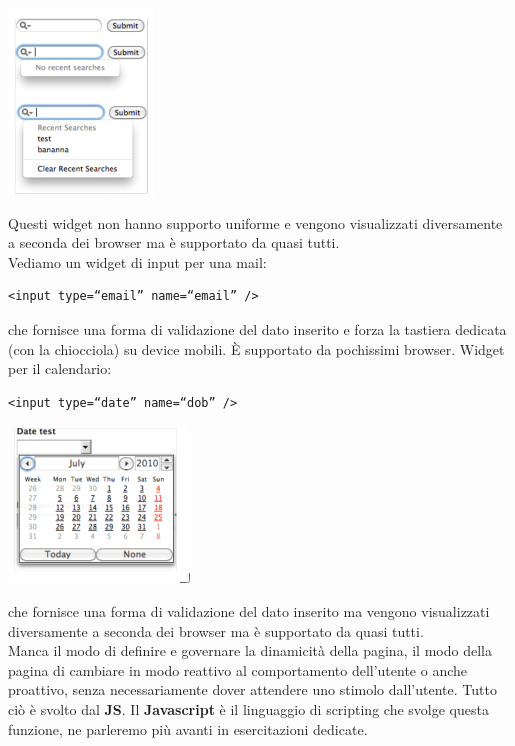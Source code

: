 \documentclass[a4paper,12pt, oneside]{book}
\begin{document}
\begin{center}
	\includegraphics[scale=0.8]{img/see.png}
\end{center}
Questi widget non hanno supporto uniforme e vengono visualizzati diversamente a seconda dei browser ma è supportato da quasi tutti.\\
Vediamo un widget di input per una mail:
\begin{verbatim}
<input type=“email” name=“email” />
\end{verbatim}
che fornisce una forma di validazione del dato inserito e forza la tastiera dedicata (con la chiocciola) su device mobili. È supportato da pochissimi browser.
\newpage
Widget per il calendario:
\begin{verbatim}
<input type=“date” name=“dob” />
\end{verbatim}
\begin{center}
	\includegraphics[scale=0.9]{img/date.png}
\end{center}
che fornisce una forma di validazione del dato inserito ma vengono visualizzati diversamente a seconda dei browser ma è supportato da quasi tutti.\\
Manca il modo di definire e governare la dinamicità della pagina, il modo
della pagina di cambiare in modo reattivo al comportamento dell'utente o anche proattivo, senza necessariamente dover attendere uno stimolo dall'utente. Tutto ciò è svolto dal\textbf{ JS}. Il \textbf{Javascript} è il linguaggio di scripting che svolge questa funzione, ne parleremo più avanti in esercitazioni dedicate.\\
\end{document}
